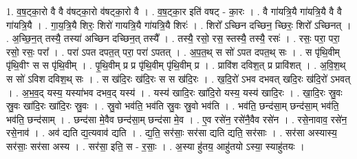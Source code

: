 \documentclass[17pt]{extarticle}
\begin{document}
1. व॒ष॒ट्का॒रो वै वै व॑षट्का॒रो व॑षट्का॒रो वै । . व॒ष॒ट्का॒र इति॑ वषट् - का॒रः । . वै गा॑यत्रि॒यै गा॑यत्रि॒यै वै वै गा॑यत्रि॒यै । . गा॒य॒त्रि॒यै शिरः॒ शिरो॑ गायत्रि॒यै गा॑यत्रि॒यै शिरः॑ । . शिरो᳚ ऽच्छिन दच्छिन॒ च्छिरः॒ शिरो᳚ ऽच्छिनत् । . अ॒च्छि॒न॒त् तस्यै॒ तस्या॑ अच्छिन दच्छिन॒त् तस्यै᳚ । . तस्यै॒ रसो॒ रस॒ स्तस्यै॒ तस्यै॒ रसः॑ । . रसः॒ परा॒ परा॒ रसो॒ रसः॒ परा᳚ । . परा॑ ऽपत दपत॒त् परा॒ परा॑ ऽपतत् । . अ॒प॒त॒थ् स सो॑ ऽपत दपत॒थ् सः । . स पृ॑थि॒वीम् पृ॑थि॒वीꣳ स स पृ॑थि॒वीम् । . पृ॒थि॒वीम् प्र प्र पृ॑थि॒वीम् पृ॑थि॒वीम् प्र । . प्रावि॑श दविश॒त् प्र प्रावि॑शत् । . अ॒वि॒श॒थ् स सो॑ ऽविश दविश॒थ् सः । . स ख॑दि॒रः ख॑दि॒रः स स ख॑दि॒रः । . ख॒दि॒रो॑ ऽभव दभवत् खदि॒रः ख॑दि॒रो॑ ऽभवत् । . अ॒भ॒व॒द् यस्य॒ यस्या॑भव दभव॒द् यस्य॑ । . यस्य॑ खादि॒रः खा॑दि॒रो यस्य॒ यस्य॑ खादि॒रः । . खा॒दि॒रः स्रु॒वः स्रु॒वः खा॑दि॒रः खा॑दि॒रः स्रु॒वः । . स्रु॒वो भव॑ति॒ भव॑ति स्रु॒वः स्रु॒वो भव॑ति । . भव॑ति॒ छन्द॑सा॒म् छन्द॑सा॒म् भव॑ति॒ भव॑ति॒ छन्द॑साम् । . छन्द॑सा मे॒वैव छन्द॑सा॒म् छन्द॑सा मे॒व । . ए॒व रसे॑न॒ रसे॑नै॒वैव रसे॑न । . रसे॒नावाव॒ रसे॑न॒ रसे॒नाव॑ । . अव॑ द्यति द्य॒त्यवाव॑ द्यति । . द्य॒ति॒ सर॑साः॒ सर॑सा द्यति द्यति॒ सर॑साः । . सर॑सा अस्यास्य॒ सर॑साः॒ सर॑सा अस्य । . सर॑सा॒ इति॒ स - र॒साः॒ । . अ॒स्या हु॑तय॒ आहु॑तयो ऽस्या॒ स्याहु॑तयः । \newline
\end{document}
